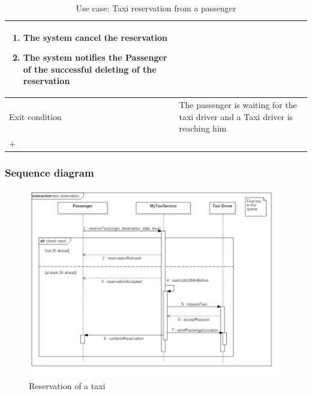 \begin{center}
\begin{longtable}{| p{} | p{} |}
\begin{enumerate}
		\item The system cancel the reservation
		\item The system notifies the Passenger of the successful deleting of the reservation
		\end{enumerate} \\ \hline
Exit condition & The passenger is waiting for the taxi driver and a Taxi driver is reaching him
		\\ \hline
		\caption{Use case: Taxi reservation from a passenger}+
		\label{reserveTaxiUC}
	\end{longtable}
\end{center}

\subsubsection{Sequence diagram}
\begin{figure}[H]
\centering
\includegraphics[scale=0.5]{Images/sequence_taxi_reservation}
\caption{Reservation of a taxi}
\label{reserve_taxi_SD}
\end{figure}


